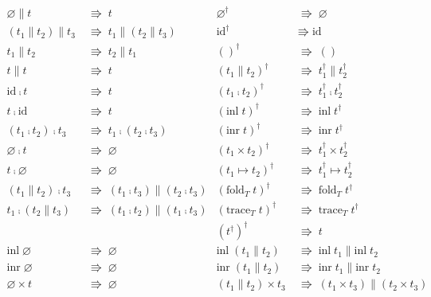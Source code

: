 \documentclass[a4j, dvipdfmx]{jsarticle}
\theoremstyle{definition}
\newcommand{\reduct}[2]{#1 &\;\Rrightarrow\; #2}
\begin{document}
\begin{figure}[H]
  \begin{align*}
    \reduct{\varnothing\parallel{}t}{t} &
    \reduct{\varnothing^\dagger}{\varnothing} \\
    \reduct{(t_1\parallel{}t_2)\parallel{}t_3}{t_1\parallel(t_2\parallel{}t_3)} &
    \reduct{\text{id}^\dagger}{\text{id}} \\
    \reduct{t_1\parallel{}t_2}{t_2\parallel{}t_1} &
    \reduct{()^\dagger}{()} \\
    \reduct{t\parallel{}t}{t} &
    \reduct{(t_1\parallel{}t_2)^\dagger}{t_1^\dagger\parallel{}t_2^\dagger} \\
    \reduct{\text{id}\fcmp{}t}{t} &
    \reduct{(t_1\fcmp{}t_2)^\dagger}{t_1^\dagger\fcmp{}t_2^\dagger} \\
    \reduct{t\fcmp\text{id}}{t} &
    \reduct{(\text{inl}\;t)^\dagger}{\text{inl}\;t^\dagger} \\
    \reduct{(t_1\fcmp{}t_2)\fcmp{}t_3}{t_1\fcmp(t_2\fcmp{}t_3)} &
    \reduct{(\text{inr}\;t)^\dagger}{\text{inr}\;t^\dagger} \\
    \reduct{\varnothing\fcmp{}t}{\varnothing} &
    \reduct{(t_1\times{}t_2)^\dagger}{t_1^\dagger\times{}t_2^\dagger} \\
    \reduct{t\fcmp\varnothing}{\varnothing} &
    \reduct{(t_1\mapsto{}t_2)^\dagger}{t_1^\dagger\mapsto{}t_2^\dagger} \\
    \reduct{(t_1\parallel{}t_2)\fcmp{}t_3}{(t_1\fcmp{}t_3)\parallel(t_2\fcmp{}t_3)} &
    \reduct{(\text{fold}_T\;t)^\dagger}{\text{fold}_T\;t^\dagger} \\
    \reduct{t_1\fcmp(t_2\parallel{}t_3)}{(t_1\fcmp{}t_2)\parallel(t_1\fcmp{}t_3)} &
    \reduct{(\text{trace}_T\;t)^\dagger}{\text{trace}_T\;t^\dagger} \\
    && \reduct{(t^\dagger)^\dagger}{t} \\
    \reduct{\text{inl}\;\varnothing}{\varnothing} &
    \reduct{\text{inl}\;(t_1\parallel{}t_2)}{\text{inl}\;t_1\parallel\text{inl}\;t_2} \\
    \reduct{\text{inr}\;\varnothing}{\varnothing} &
    \reduct{\text{inr}\;(t_1\parallel{}t_2)}{\text{inr}\;t_1\parallel\text{inr}\;t_2} \\
    \reduct{\varnothing\times{}t}{\varnothing} &
    \reduct{(t_1\parallel{}t_2)\times{}t_3}{(t_1\times{}t_3)\parallel(t_2\times{}t_3)} \\

\end{align*}
\end{figure}
\end{document}
